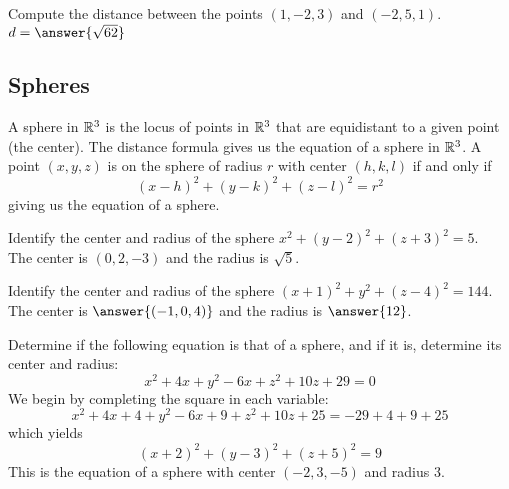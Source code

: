 \documentclass[handout]{ximera}
\begin{document}

\begin{problem} Compute the distance between the points $(1, -2, 3)$ and $(-2, 5, 1)$.\\
$d = \answer{\sqrt{62}}$
\end{problem}

\subsection{Spheres}
A sphere in $\mathbb R^3$ is the locus of points in $\mathbb R^3$ that are equidistant to a given point (the center).
The distance formula gives us the equation of a sphere in $\mathbb R^3$.  A point $(x, y, z)$ is on the sphere of radius $r$ with center $(h, k, l)$
if and only if
\[
(x-h)^2 + (y-k)^2 + (z -l)^2 = r^2
\]
giving us the equation of a sphere.

\begin{example}
Identify the center and radius of the sphere $x^2 + (y-2)^2 + (z+3)^2 = 5$.\\
The center is $(0, 2, -3)$ and the radius is $\sqrt 5$.
\end{example}

\begin{problem}
Identify the center and radius of the sphere $(x+1)^2 + y^2 + (z-4)^2 = 144$.\\
The center is $\answer{(-1, 0, 4)}$ and the radius is $\answer{12}$.
\end{problem}


\begin{example}
Determine if the following equation is that of a sphere, and if it is, determine its center and radius:
\[
x^2 + 4x + y^2 - 6x + z^2 + 10z + 29 = 0
\]
We begin by completing the square in each variable:
\[
x^2 + 4x + 4 + y^2 - 6x + 9 + z^2 + 10z + 25 =-29 + 4 + 9 + 25
\]
which yields
\[
(x+2)^2 +(y-3)^2 + (z+5)^2 = 9
\]
This is the equation of a sphere with center $(-2, 3, -5)$ and radius $3$. 
\end{example}
\end{document}
